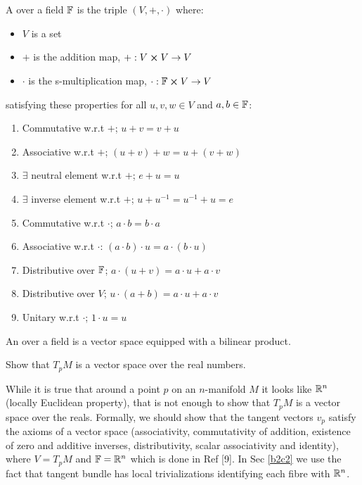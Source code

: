 \documentclass[10pt]{article}
\begin{document}
\begin{definition}
\\\\
A  over a field $\mathbb{F}$ is the triple $(V, +, \cdot)$ where:
\begin{itemize}
	\item $V$ is a set
	\item $+$ is the addition map, $+:V \cross V \to V$
	\item $\cdot$ is the s-multiplication map, $\cdot:\mathbb{F} \cross V \to V$
\end{itemize}
satisfying these properties for all $u,v,w \in V$ and $a,b \in \mathbb{F}$:
\begin{enumerate}
	\item Commutative w.r.t $+$; $u+v = v+u$
	\item Associative w.r.t $+$; $(u+v)+w = u+(v+w)$
	\item $\exists$ neutral element w.r.t $+$; $e+u = u$ 
	\item $\exists$ inverse element w.r.t $+$; $u+u^{-1}=u^{-1}+u=e$
	\item Commutative w.r.t $\cdot$; $a\cdot b = b\cdot a$
	\item Associative w.r.t $\cdot$: $(a\cdot b)\cdot u = a\cdot (b\cdot u)$
	\item Distributive over $\mathbb{F}$; $a \cdot(u+v) = a \cdot u+a \cdot v$
	\item Distributive over $V$; $u \cdot(a+b) = a \cdot u+a \cdot v$
	\item Unitary w.r.t $\cdot$; $1\cdot u = u$
\end{enumerate}
An  over a field is a vector space equipped with a bilinear product.
\end{definition}


\begin{example}
	Show that $T_pM$ is a vector space over the real numbers.
\end{example}
\sol While it is true that around a point $p$ on an $n$-manifold $M$ it looks like $\mathbb{R}^n$ (locally Euclidean property), that is not enough to show that $T_pM$ is a vector space over the reals. Formally, we should show that the tangent vectors $v_p$ satisfy the axioms of a vector space (associativity, commutativity of addition, existence of zero and additive inverses, distributivity, scalar associativity and identity), where $V = T_pM$ and $\mathbb{F} = \mathbb{R}^n$ which is done in Ref [9]. In Sec \ref{b2c2} we use the fact that tangent bundle has local trivializations identifying each fibre with $\mathbb{R}^n$.
\end{document}
